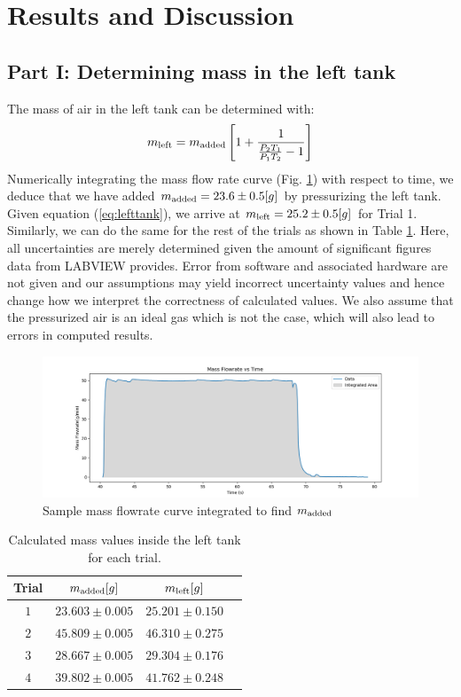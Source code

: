 \documentclass[12pt]{article}
\begin{document}
\section*{Results and Discussion}
\subsection*{Part I: Determining mass in the left tank}
The mass of air in the left tank can be determined with:
\begin{equation}
    m_{\rm left}=m_{\rm added}\left[1+\frac{1}{\frac{P_2T_1}{P_1T_2}-1}\right]
    \label{eq:lefttank}
\end{equation}
Numerically integrating the mass flow rate curve (Fig. \ref{fig:mass}) with respect to time, we deduce that we have added $m_{\rm added}=23.6\pm0.5[g]$ by pressurizing the left tank. Given equation (\ref{eq:lefttank}), we arrive at $m_{\rm left}=25.2\pm0.5[g]$ for Trial 1. Similarly, we can do the same for the rest of the trials as shown in Table \ref{table:mass}. Here, all uncertainties are merely determined given the amount of significant figures data from LABVIEW \autocite{che} provides. Error from software and associated hardware are not given and our assumptions may yield incorrect uncertainty values and hence change how we interpret the correctness of calculated values. We also assume that the pressurized air is an ideal gas which is not the case, which will also lead to errors in computed results.
\begin{figure}[t!]
\centering
\includegraphics[width=0.9\linewidth]{figure/mass.png}
\caption{Sample mass flowrate curve integrated to find $m_{\rm added}$}
\label{fig:mass}
\end{figure}
\begin{table}[h]
  \centering
  \begin{tabular}{|c|c|c|c|}
    \hline
    Trial & $m_{\rm added}[g]$ & $m_{\rm left}[g]$\\
    \hline
    $1 $& $23.603\pm0.005$ & $25.201\pm0.150$\\
    $2 $& $45.809\pm0.005$ & $46.310\pm0.275$\\
    $3 $& $28.667\pm0.005$ & $29.304\pm0.176$\\
    $4 $& $39.802\pm0.005$ & $41.762\pm0.248$\\
    \hline
  \end{tabular}
  \caption{Calculated mass values inside the left tank for each trial.}
  \label{table:mass}
\end{table}
\end{document}
